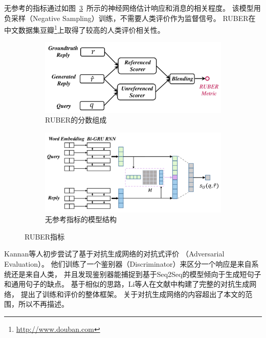 无参考的指标通过如图~\ref{fig:RUBER_unref_model}~所示的神经网络估计响应和消息的相关程度。
该模型用负采样（Negative Sampling）训练，不需要人类评价作为监督信号。
RUBER在中文数据集豆瓣\footnote{\url{http://www.douban.com}}上取得了较高的人类评价相关性。
\begin{figure}[H]
    \begin{subfigure}{0.45\linewidth}
        \centering
        \includegraphics[width=\linewidth]{figure/RUBER_overview.png}
        \caption{RUBER的分数组成}
        \label{fig:RUBER_components}
    \end{subfigure}%
    \begin{subfigure}{0.45\linewidth}
        \centering
        \includegraphics[width=\linewidth]{figure/RUBER_model.png}
        \caption{无参考指标的模型结构}
        \label{fig:RUBER_unref_model}
    \end{subfigure}
    \centering
    \caption{RUBER指标}
\end{figure}

Kannan等人初步尝试了基于对抗生成网络的对抗式评价
（Adversarial Evaluation）。
他们训练了一个鉴别器（Discriminator）来区分一个响应是来自系统还是来自人类，
并且发现鉴别器能捕捉到基于Seq2Seq的模型倾向于生成短句子和通用句子的缺点。
基于相似的思路，Li等人在文献\cite{Adversarial}中构建了完整的对抗生成网络，
提出了训练和评价的整体框架。
关于对抗生成网络的内容超出了本文的范围，所以不再描述。

